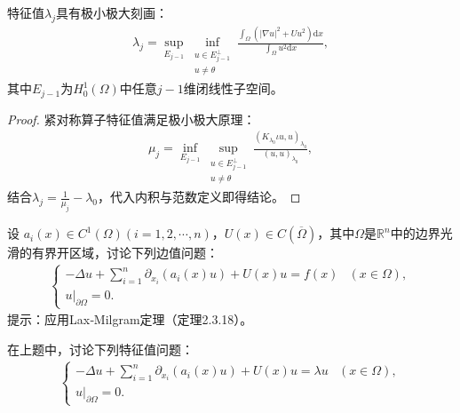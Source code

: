\documentclass[../../main.tex]{subfiles}%
\begin{document}
\begin{proposition}
特征值$\lambda_j$具有极小极大刻画：
\begin{align*}
\lambda_j=\sup_{E_{j-1}}\inf_{\substack{u\in E_{j-1}^\perp\\u\neq\theta}}\frac{\int_{\Omega}\left(|\nabla u|^2+Uu^2\right)\mathrm{d}x}{\int_{\Omega}u^2\mathrm{d}x},
\end{align*}
其中$E_{j-1}$为$H_0^1(\Omega)$中任意$j-1$维闭线性子空间。
\end{proposition}
\begin{proof}
紧对称算子特征值满足极小极大原理：
\begin{align*}
\mu_j=\inf_{E_{j-1}}\sup_{\substack{u\in E_{j-1}^\perp\\u\neq\theta}}\frac{(K_{\lambda_0}\iota u,u)_{\lambda_0}}{(u,u)_{\lambda_0}},
\end{align*}
结合$\lambda_j=\frac{1}{\mu_j}-\lambda_0$，代入内积与范数定义即得结论。
\end{proof}

\begin{example}
设 $a_i(x) \in C^1(\Omega)(i=1,2,\cdots,n)$，$U(x) \in C(\overline{\Omega})$，其中$\Omega$是$\mathbb{R}^n$中的边界光滑的有界开区域，讨论下列边值问题：
\begin{align*}
\begin{cases}
-\Delta u + \sum\limits_{i=1}^{n} \partial_{x_i}(a_i(x)u) + U(x)u = f(x) & (x \in \Omega), \\
u\big|_{\partial\Omega} = 0.
\end{cases}
\end{align*}
提示：应用Lax‑Milgram定理（定理2.3.18）。
\end{example}

\begin{example}
在上题中，讨论下列特征值问题：
\begin{align*}
\begin{cases}
-\Delta u + \sum\limits_{i=1}^{n} \partial_{x_i}(a_i(x)u) + U(x)u = \lambda u & (x \in \Omega), \\
u\big|_{\partial\Omega} = 0.
\end{cases}
\end{align*}
\end{example}
\end{document}
